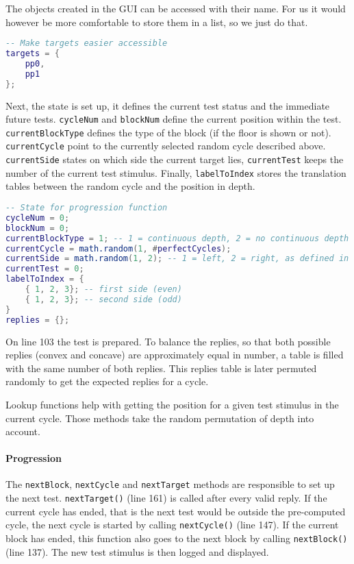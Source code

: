 The objects created in the GUI can be accessed with their name.
For us it would however be more comfortable to store them in a list, so we just do that.

\begin{lstlisting}[language=lua,firstnumber=83]
-- Make targets easier accessible
targets = {
	pp0,
	pp1
};
\end{lstlisting}

Next, the state is set up, it defines the current test status and the immediate future tests.
\texttt{cycleNum} and \texttt{blockNum}  define the current position within the test.
\texttt{currentBlockType} defines the type of the block (if the floor is shown or not).
\texttt{currentCycle} point to the currently selected random cycle described above.
\texttt{currentSide} states on which side the current target lies, \texttt{currentTest} keeps the number of the current test stimulus.
Finally, \texttt{labelToIndex} stores the translation tables between the random cycle and the position in depth.

\begin{lstlisting}[language=lua,firstnumber=89]
-- State for progression function
cycleNum = 0;
blockNum = 0;
currentBlockType = 1; -- 1 = continuous depth, 2 = no continuous depth
currentCycle = math.random(1, #perfectCycles);
currentSide = math.random(1, 2); -- 1 = left, 2 = right, as defined in targetX
currentTest = 0;
labelToIndex = {
	{ 1, 2, 3}; -- first side (even)
	{ 1, 2, 3}; -- second side (odd)
}
replies = {};
\end{lstlisting}

On line 103 the test is prepared.
To balance the replies, so that both possible replies (convex and concave) are approximately equal in number, a table is filled with the same number of both replies.
This replies table is later permuted randomly to get the expected replies for a cycle.

Lookup functions help with getting the position for a given test stimulus in the current cycle.
Those methods take the random permutation of depth into account.

\paragraph{Progression}
The \texttt{nextBlock}, \texttt{nextCycle} and \texttt{nextTarget} methods are responsible to set up the next test.
\texttt{nextTarget()} (line 161) is called after every valid reply.
If the current cycle has ended, that is the next test would be outside the pre-computed cycle, the next cycle is started by calling \texttt{nextCycle()} (line 147).
If the current block has ended, this function also goes to the next block by calling \texttt{nextBlock()} (line 137).
The new test stimulus is then logged and displayed.

